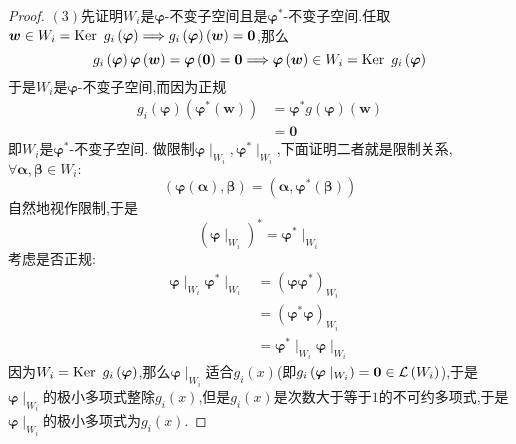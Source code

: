 {\begin{proof}
        $(3)$先证明$W_i$是$\bm{\varphi}$-不变子空间且是$\bm{\varphi}^*$-不变子空间.任取$\bm{w}\in W_i=\operatorname{Ker\,} \,g_i\left(\bm{\varphi}\right)\Longrightarrow g_i\left(\bm{\varphi}\right)\left(\bm{w}\right)=\bm{0}$,那么\[
            g_i\left(
            \bm{\varphi}
            \right)\bm{\varphi}\left(\bm{w}\right)=\bm{\varphi}\left(\bm{0}\right)=\bm{0}\Longrightarrow\bm{\varphi}\left(\bm{w}\right)\in W_i=\operatorname{Ker\,} \,g_i\left(\bm{\varphi}\right)
        \]于是$W_i$是$\bm{\varphi}$-不变子空间,而因为正规\begin{align*}
            g_i\left(\bm{\varphi}\right)\left(
            \bm{\varphi}^*\left(\bm{w}\right)
            \right) & =\bm{\varphi}^*g\left(
            \bm{\varphi}
            \right)\left(\bm{w}\right)       \\
                    & =\bm{0}
        \end{align*}
        即$W_i$是$\bm{\varphi}^*$-不变子空间.
        做限制$\bm{\varphi}\mid_{W_i},\bm{\varphi}^*\mid_{W_i}$,下面证明二者就是限制关系,$\forall\bm{\alpha},\bm{\beta}\in W_i:$\[
            \left(
            \bm{\varphi}\left(
                \bm{\alpha}
                \right),\bm{\beta}
            \right)=\left(
            \bm{\alpha},\bm{\varphi}^*\left(
                \bm{\beta}
                \right)
            \right)
        \]自然地视作限制,于是\[
            \left(
            \bm{\varphi}\mid_{W_i}
            \right)^*=\bm{\varphi}^*\mid_{W_i}
        \]考虑是否正规:\begin{align*}
            \bm{\varphi}\mid_{W_i}\bm{\varphi}^*\mid_{W_i} & =\left(
            \bm{\varphi}\bm{\varphi}^*
            \right)_{W_i}                                                                                    \\
                                                           & =\left(
            \bm{\varphi}^*\bm{\varphi}
            \right)_{W_i}                                                                                    \\
                                                           & =\bm{\varphi}^*\mid_{W_i}\bm{\varphi}\mid_{W_i}
        \end{align*}因为$W_i=\operatorname{Ker\,} \,g_i\left(\bm{\varphi}\right)$,那么$\bm{\varphi}\mid_{W_i}$适合$g_i\left(x\right)$(即$g_i\left(\bm{\varphi}\mid_{W_i}\right)=\bm{0}\in\mathcal{L} \left(W_i\right)$),于是$\bm{\varphi}\mid_{W_i}$的极小多项式整除$g_i\left(x\right)$,但是$g_i\left(x\right)$是次数大于等于$1$的不可约多项式,于是$\bm{\varphi}\mid_{W_i}$的极小多项式为$g_i\left(x\right)$.
    \end{proof}
}
